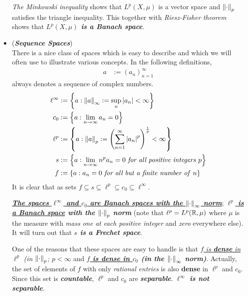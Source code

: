\documentclass[11pt]{article}
\begin{document}
\begin{itemize}
\begin{example}
\begin{remark}
\emph{The Minkowski inequality} shows that $L^{p}(X, \mu)$ is a vector space and $\left\|\cdot\right\|_{p}$ satisfies the triangle inequality. This together with \emph{Riesz-Fisher theorem} shows that \emph{\textbf{$L^{p}(X, \mu)$ is a Banach space}}.
\end{remark}
\end{example}


\item \begin{example}(\emph{\textbf{Sequence Spaces}})\\
There is a nice class of spaces which is easy to describe and which we will often use to illustrate various concepts.
In the following definitions,
\begin{align*}
a &:= (a_n)_{n=1}^{\infty}
\end{align*} always denotes a sequence of complex numbers.
\begin{align*}
\ell^{\infty} &:= \left\{a: \left\|a\right\|_{\infty}:= \sup_{n}\left\lvert a_n \right\rvert < \infty \right\}\\
c_{0} &:= \left\{a: \lim\limits_{n\rightarrow \infty}a_n = 0\right\}\\
\ell^{p} &:= \left\{a: \left\|a\right\|_{p}:= \left(\sum_{n=1}^{\infty}\left\lvert a_n \right\rvert^{p}\right)^{\frac{1}{p}} < \infty \right\}\\
s &:= \left\{a:  \lim\limits_{n\rightarrow \infty}n^{p}a_{n}= 0 \text{ \emph{for all positive integers} }p\right\}\\
f &:=  \left\{a: a_{n} = 0\text{ \emph{for all but a finite number of} }n\right\}
\end{align*} It is clear that as sets $f \subseteq s \subseteq \ell^{p} \subseteq c_{0} \subseteq \ell^{\infty}$.

\underline{\emph{\textbf{The spaces $\ell^{\infty}$ and $c_{0}$ are Banach spaces with the $\left\|\cdot\right\|_{\infty}$ norm}}}; \emph{\textbf{\underline{$\ell^{p}$ is a Banach space} with the $\left\|\cdot\right\|_{p}$ norm}} (note that $\ell^{p}= L^{p}({\mathbb R}, \mu)$ where $\mu$ is the measure with \emph{mass one at each positive integer} and \emph{zero} everywhere else). It will turn out that \emph{\textbf{$s$ is a Frechet space}}. 

One of the reasons that these spaces are easy to handle is that \emph{\underline{$f$ is \textbf{dense} in $\ell^{p}$} (in $\left\|\cdot\right\|_{p}$; $p < \infty$} and \emph{\textbf{\underline{$f$ is dense in $c_{0}$} (in the $\left\|\cdot\right\|_{\infty}$ norm)}}. Actually, the set of elements of $f$ with only \emph{rational entries} is also \textbf{dense} in $\ell^{p}$ and $c_{0}$. Since this set is \emph{\textbf{countable}}, $\ell^{p}$ and $c_{0}$ are \emph{\textbf{separable}}. \emph{\textbf{$\ell^{\infty}$ is not separable}}.
\end{example}




\end{itemize}
\end{document}
